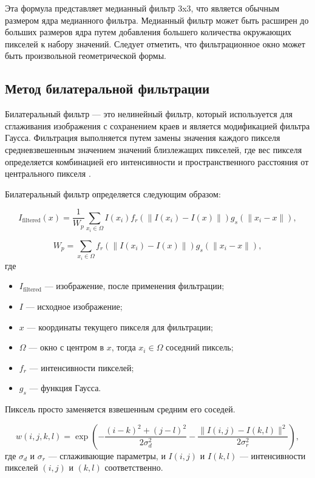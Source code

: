 Эта формула представляет медианный фильтр 3x3, что является обычным размером ядра медианного фильтра. Медианный фильтр может быть расширен до больших размеров ядра путем добавления большего количества окружающих пикселей к набору значений. Следует отметить, что фильтрационное окно может быть произвольной геометрической формы.

\subsection{Метод билатеральной фильтрации}

Билатеральный фильтр --- это нелинейный фильтр, который используется для сглаживания изображения с сохранением краев и является модификацией фильтра Гаусса. Фильтрация выполняется путем замены значения каждого пикселя средневзвешенным значением значений близлежащих пикселей, где вес пикселя определяется комбинацией его интенсивности и пространственного расстояния от центрального пикселя \cite{bilateralfilter}.

Билатеральный фильтр определяется следующим образом:

\begin{equation}
	I_\text{filtered}(x) = \frac{1}{W_p} \sum_{x_i \in \Omega} I(x_i)f_r(\|I(x_i) - I(x)\|)g_s(\|x_i - x\|),
\end{equation}

\begin{equation}
	W_p = \sum_{x_i \in \Omega}{f_r(\|I(x_i) - I(x)\|)g_s(\|x_i - x\|)},
\end{equation}
где
\begin{itemize}
	\item $I_\text{filtered}$ --- изображение, после применения фильтрации;
	\item $I$ --- исходное изображение;
	\item $x$ --- координаты текущего пикселя для фильтрации;
	\item $\Omega$ --- окно с центром в $x$, тогда $x_i \in \Omega$ соседний пиксель;
	\item $f_r$ --- интенсивности пикселей;
	\item $g_s$ --- функция Гаусса.
\end{itemize}

Пиксель просто заменяется взвешенным средним его соседей.

\noindent
\begin{equation}
	w(i, j, k, l) = \exp\left(-\frac{(i - k)^2 + (j - l)^2}{2 \sigma_d^2} - \frac{\|I(i, j) - I(k, l)\|^2}{2 \sigma_r^2}\right),
\end{equation}
где $\sigma_d$ и $\sigma_r$ --- сглаживающие параметры, и $I(i, j)$ и $I(k, l)$ --- интенсивности пикселей $(i, j)$ и $ (k, l)$ соответственно.

